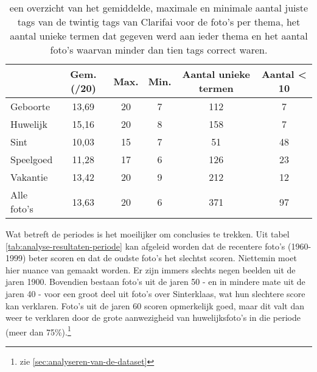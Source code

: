 	
\begin{table}
	\centering
	\begin{tabular}{l|ccccc}
	 	\toprule
		 & Gem. (/20) & Max. & Min. & Aantal unieke termen & Aantal  < 10 \\ 
		\midrule
		Geboorte & 13,69 & 20 & 7 & 112 & 7 \\ 
		Huwelijk & 15,16 & 20 & 8 & 158 & 7 \\ 
		Sint & 10,03 & 15 & 7 & 51 & 48 \\ 
		Speelgoed & 11,28 & 17 & 6 & 126 & 23 \\ 
		Vakantie & 13,42 & 20 & 9 & 212 & 12 \\ 
		Alle foto's & 13,63 & 20 & 6 & 371 & 97 \\ 
	\bottomrule
	\end{tabular} 
	\caption[een overzicht van de resultaten per thema na gebruikt van het ingebouwde model van Clarifai]{een overzicht van het gemiddelde, maximale en minimale aantal juiste tags van de twintig tags van Clarifai voor de foto’s per thema, het aantal unieke termen dat gegeven werd aan ieder thema en het aantal foto’s waarvan minder dan tien tags correct waren. }
	\label{tab:analyse-resultaten-thema}
\end{table}

Wat betreft de periodes is het moeilijker om conclusies te trekken. Uit tabel \ref{tab:analyse-resultaten-periode} kan afgeleid worden dat de recentere foto’s (1960-1999) beter scoren en dat de oudste foto’s het slechtst scoren. Niettemin moet hier nuance van gemaakt worden. Er zijn immers slechts negen beelden uit de jaren 1900. Bovendien bestaan foto’s uit de jaren 50 - en in mindere mate uit de jaren 40 - voor een groot deel uit foto’s over Sinterklaas, wat hun slechtere score kan verklaren. Foto’s uit de jaren 60 scoren opmerkelijk goed, maar dit valt dan weer te verklaren door de grote aanwezigheid van huwelijksfoto’s in die periode (meer dan 75\%).\footnote{zie \ref{sec:analyseren-van-de-dataset}}

